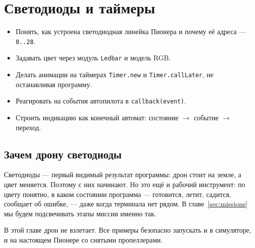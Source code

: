 \section{Светодиоды и таймеры}
\label{sec:leds}

\begin{infobox}
\begin{itemize}
    \item Понять, как устроена светодиодная линейка Пионера и почему её адреса --- \texttt{0..28}.
    \item Задавать цвет через модуль \texttt{Ledbar} и модель RGB.
    \item Делать анимации на таймерах \texttt{Timer.new} и \texttt{Timer.callLater}, не останавливая программу.
    \item Реагировать на события автопилота в \texttt{callback(event)}.
    \item Строить индикацию как конечный автомат: состояние $\to$ событие $\to$ переход.
\end{itemize}
\end{infobox}

\subsection{Зачем дрону светодиоды}

Светодиоды --- первый видимый результат программы: дрон стоит на земле, а цвет меняется. Поэтому с них начинают. Но это ещё и рабочий инструмент: по цвету понятно, в каком состоянии программа --- готовится, летит, садится, сообщает об ошибке, --- даже когда терминала нет рядом. В главе~\ref{sec:missions} мы будем подсвечивать этапы миссии именно так.

В этой главе дрон не взлетает. Все примеры безопасно запускать и в симуляторе, и на настоящем Пионере со снятыми пропеллерами.

